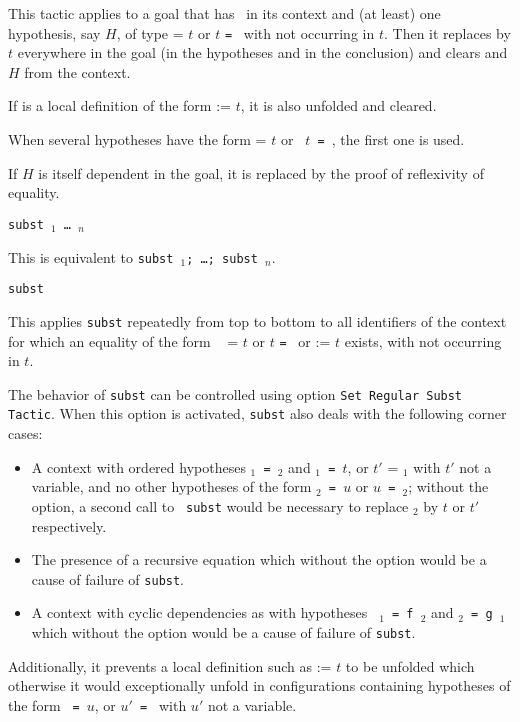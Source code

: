 \begin{coq_example*}
This tactic applies to a goal that has \ident\ in its context and (at
least) one hypothesis, say $H$, of type {\tt \ident} = $t$ or $t$
{\tt = \ident} with {\ident} not occurring in $t$.  Then it replaces
{\ident} by $t$ everywhere in the goal (in the hypotheses and in the
conclusion) and clears {\ident} and $H$ from the context.

If {\ident} is a local definition of the form {\ident} := $t$, it is
also unfolded and cleared.

\Rem
When several hypotheses have the form {\tt \ident} = $t$ or {\tt
  $t$ = \ident}, the first one is used.

\Rem
If $H$ is itself dependent in the goal, it is replaced by the
proof of reflexivity of equality.

\begin{Variants}
  \item {\tt subst \ident$_1$ {\dots} \ident$_n$}

    This is equivalent to {\tt subst \ident$_1$; \dots; subst \ident$_n$}.
  \item {\tt subst}

    This applies {\tt subst} repeatedly from top to bottom to all
    identifiers of the context for which an equality of the form {\tt
      \ident} = $t$ or $t$ {\tt = \ident} or {\tt \ident} := $t$ exists, with
    {\ident} not occurring in $t$.

 The behavior of {\tt subst} can be controlled
using option {\tt Set Regular Subst Tactic}. When this option is
activated, {\tt subst} also deals with the following corner cases:
\begin{itemize}
\item A context with ordered hypotheses {\tt \ident$_1$ = \ident$_2$}
  and {\tt \ident$_1$ = $t$}, or {$t'$ = \ident$_1$} with $t'$ not a
  variable, and no other hypotheses of the form {\tt \ident$_2$ = $u$}
  or {\tt $u$ = \ident$_2$}; without the option, a second call to {\tt
    subst} would be necessary to replace {\ident$_2$} by $t$ or $t'$
  respectively.

\item The presence of a recursive equation which without the option
  would be a cause of failure of {\tt subst}.
  
\item A context with cyclic dependencies as with hypotheses {\tt
  \ident$_1$ = f~\ident$_2$} and {\tt \ident$_2$ = g~\ident$_1$} which
  without the option would be a cause of failure of {\tt subst}.
\end{itemize}
Additionally, it prevents a local definition such as {\tt \ident} :=
  $t$ to be unfolded which otherwise it would exceptionally unfold in
configurations containing hypotheses of the form {\tt {\ident} = $u$},
or {\tt $u'$ = \ident} with $u'$ not a variable.


\end{Variants}
\end{coq_example*}
